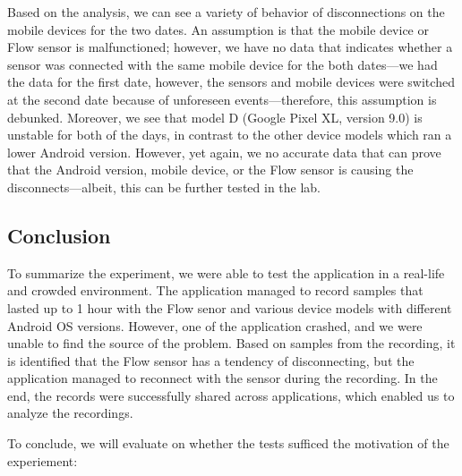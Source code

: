 Based on the analysis, we can see a variety of behavior of disconnections on the mobile devices for the two dates. An assumption is that the mobile device or Flow sensor is malfunctioned; however, we have no data that indicates whether a sensor was connected with the same mobile device for the both dates---we had the data for the first date, however, the sensors and mobile devices were switched at the second date because of unforeseen events---therefore, this assumption is debunked. Moreover, we see that model D (Google Pixel XL, version 9.0) is unstable for both of the days, in contrast to the other device models which ran a lower Android version. However, yet again, we no accurate data that can prove that the Android version, mobile device, or the Flow sensor is causing the disconnects---albeit, this can be further tested in the lab.

\subsection{Conclusion}
To summarize the experiment, we were able to test the application in a real-life and crowded environment. The application managed to record samples that lasted up to 1 hour with the Flow senor and various device models with different Android OS versions. However, one of the application crashed, and we were unable to find the source of the problem. Based on samples from the recording, it is identified that the Flow sensor has a tendency of disconnecting, but the application managed to reconnect with the sensor during the recording. In the end, the records were successfully shared across applications, which enabled us to analyze the recordings.  

To conclude, we will evaluate on whether the tests sufficed the motivation of the experiement:

